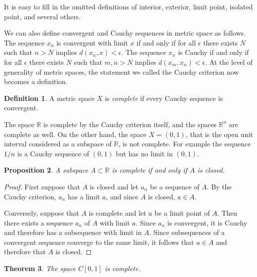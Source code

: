 \documentclass[11pt,oneside]{amsbook}
\newcommand{\R}{\mathbb R}
\theoremstyle{definition}
\theoremstyle{plain}
\newtheorem{thm}{Theorem}[section]
\newtheorem{prop}[thm]{Proposition}
\theoremstyle{definition}
\newtheorem{defn}[thm]{Definition}
\theoremstyle{remark}
\numberwithin{equation}{section}
\numberwithin{figure}{section}
\begin{document}
It is easy to fill in the omitted definitions of interior, exterior, limit point, isolated point, and several others.

We can also define convergent and Cauchy sequences in metric space as follows. The sequence $x_n$ is convergent with limit $x$ if and only if for all $\epsilon$ there exists $N$ such that $n>N$ implies $d(x_n,x)<\epsilon$. The sequence $x_n$ is Cauchy if and only if for all $\epsilon$ there exists $N$ such that $m,n>N$ implies $d(x_m,x_n)<\epsilon$. At the level of generality of metric spaces, the statement we called the Cauchy criterion now becomes a definition.

\begin{defn}
  A metric space $X$ is \emph{complete} if every Cauchy sequence is convergent.
\end{defn}

The space $\R$ is complete by the Cauchy criterion itself, and the spaces $\R^n$ are complete as well. On the other hand, the space $X=(0,1)$, that is the open unit interval considered as a subspace of $\R$, is not complete. For example the sequence $1/n$ is a Cauchy sequence of $(0,1)$ but has no limit in $(0,1)$.

\begin{prop}
  A subspace $A\subset\R$ is complete if and only if $A$ is closed.
\end{prop}

\begin{proof}
  First suppose that $A$ is closed and let $a_n$ be a sequence of $A$. By the Cauchy criterion, $a_n$ has a limit $a$, and since $A$ is closed, $a\in A$. 

  Conversely, suppose that $A$ is complete and let $a$ be a limit point of $A$. Then there exists a sequence $a_n$ of $A$ with limit $a$. Since $a_n$ is convergent, it is Cauchy and therefore has a subsequence with limit in $A$. Since subsequences of a convergent sequence converge to the same limit, it follows that $a\in A$ and therefore that $A$ is closed.
\end{proof}

\begin{thm}
  The space $C[0,1]$ is complete.
\end{thm}
\end{document}
